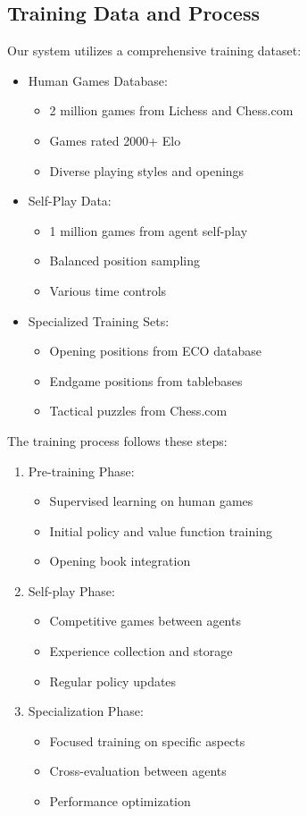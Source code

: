 \documentclass[conference]{IEEEtran}
\begin{document}
\subsection{Training Data and Process}
Our system utilizes a comprehensive training dataset:

\begin{itemize}
\item Human Games Database:
   \begin{itemize}
   \item 2 million games from Lichess and Chess.com
   \item Games rated 2000+ Elo
   \item Diverse playing styles and openings
   \end{itemize}
\item Self-Play Data:
   \begin{itemize}
   \item 1 million games from agent self-play
   \item Balanced position sampling
   \item Various time controls
   \end{itemize}
\item Specialized Training Sets:
   \begin{itemize}
   \item Opening positions from ECO database
   \item Endgame positions from tablebases
   \item Tactical puzzles from Chess.com
   \end{itemize}
\end{itemize}

The training process follows these steps:

\begin{enumerate}
\item Pre-training Phase:
   \begin{itemize}
   \item Supervised learning on human games
   \item Initial policy and value function training
   \item Opening book integration
   \end{itemize}
\item Self-play Phase:
   \begin{itemize}
   \item Competitive games between agents
   \item Experience collection and storage
   \item Regular policy updates
   \end{itemize}
\item Specialization Phase:
   \begin{itemize}
   \item Focused training on specific aspects
   \item Cross-evaluation between agents
   \item Performance optimization
   \end{itemize}
\end{enumerate}
\end{document}

